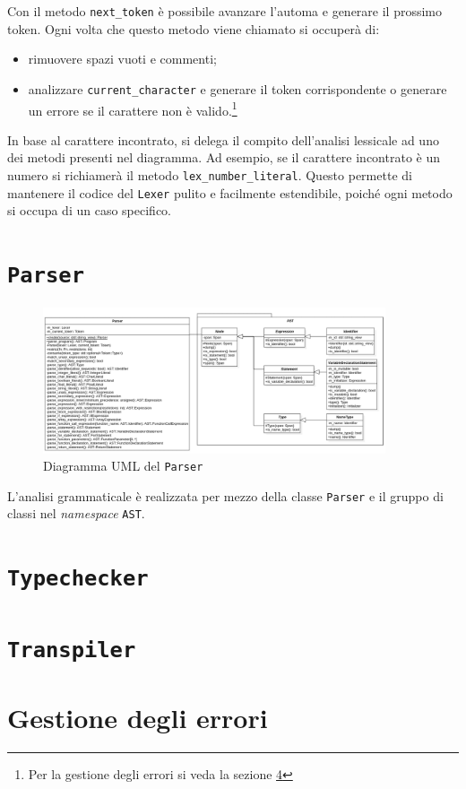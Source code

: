 Con il metodo \texttt{next\_token} \`e possibile avanzare l'automa e generare il prossimo token. Ogni volta che questo metodo viene chiamato si occuper\`a di:
\begin{itemize}
	\item rimuovere spazi vuoti e commenti;
	\item analizzare \texttt{current\_character} e generare il token corrispondente o generare un errore se il carattere non \`e valido.\footnote{Per la gestione degli errori si veda la sezione \ref{sec:gestione-degli-errori}}
\end{itemize}
In base al carattere incontrato, si delega il compito dell'analisi lessicale ad uno dei metodi presenti nel diagramma. Ad esempio, se il carattere incontrato \`e un numero si richiamer\`a il metodo \texttt{lex\_number\_literal}. Questo permette di mantenere il codice del \texttt{Lexer} pulito e facilmente estendibile, poich\'e ogni metodo si occupa di un caso specifico.

\section{\texttt{Parser}}
\label{sec:parser}

\begin{figure}[H]
	\centering
	\includegraphics[width=0.9\textwidth]{figures/parser.png}
	\caption{Diagramma UML del \texttt{Parser}}
	\label{fig:parser-uml}
\end{figure}

L'analisi grammaticale \`e realizzata per mezzo della classe \texttt{Parser} e il gruppo di classi nel \textit{namespace} \texttt{AST}.

\section{\texttt{Typechecker}}
\label{sec:typechecker}

\section{\texttt{Transpiler}}
\label{sec:transpiler}

\section{Gestione degli errori}
\label{sec:gestione-degli-errori}
